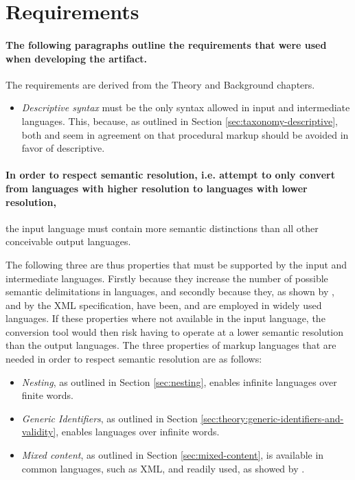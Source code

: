 \documentclass{scrreprt}
\begin{document}
\section{Requirements}
\label{sec:empirical-requirements}
\paragraph{The following paragraphs outline the requirements that were used when developing the artifact.} The requirements are derived from the Theory and Background chapters.

\begin{itemize}
\item \emph{Descriptive syntax} must be the only syntax allowed in input and intermediate languages. This, because, as outlined in Section \ref{sec:taxonomy-descriptive}, both \citet{coombs} and \citet{bray} seem in agreement on that procedural markup should be avoided in favor of descriptive.
\end{itemize}


\paragraph{In order to respect semantic resolution, i.e. attempt to only convert from languages with higher resolution to languages with lower resolution,} the input language must contain more semantic distinctions than all other conceivable output languages.

The following three are thus properties that must be supported by the input and intermediate languages. Firstly because they increase the number of possible semantic delimitations in languages, and secondly because they, as shown by \citet{coombs}, and by the XML specification, have been, and are employed in widely used languages. If these properties where not available in the input language, the conversion tool would then risk having to operate at a lower semantic resolution than the output languages. The three properties of markup languages that are needed in order to respect semantic resolution are as follows:

\begin{itemize}
\item \emph{Nesting}, as outlined in Section \ref{sec:nesting}, enables infinite languages over finite words.
\item \emph{Generic Identifiers}, as outlined in Section \ref{sec:theory:generic-identifiers-and-validity}, enables languages over infinite words.
\item \emph{Mixed content}, as outlined in Section \ref{sec:mixed-content}, is available in common languages, such as XML, and readily used, as showed by \citet{mignet}.
\end{itemize}
\end{document}
